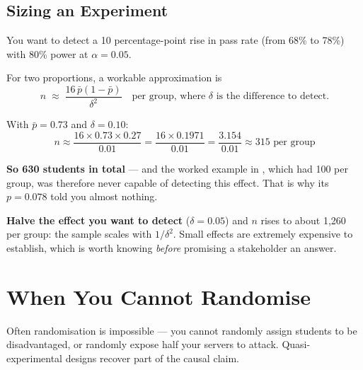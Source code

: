 \subsection{Sizing an Experiment}

\begin{worked}
You want to detect a 10 percentage-point rise in pass rate (from 68\% to 78\%) with
80\% power at $\alpha = 0.05$.

\smallskip
For two proportions, a workable approximation is
\[
n \;\approx\; \frac{16 \,\bar{p}(1-\bar{p})}{\delta^2}
\quad\text{per group, where } \delta \text{ is the difference to detect.}
\]

With $\bar{p} = 0.73$ and $\delta = 0.10$:
\[
n \approx \frac{16 \times 0.73 \times 0.27}{0.01}
        = \frac{16 \times 0.1971}{0.01}
        = \frac{3.154}{0.01} \approx 315 \text{ per group}
\]

\textbf{So 630 students in total} --- and the worked example in ,
which had 100 per group, was therefore never capable of detecting this effect. That
is why its $p = 0.078$ told you almost nothing.

\smallskip
\textbf{Halve the effect you want to detect} ($\delta = 0.05$) and $n$ rises to
about 1{,}260 per group: the sample scales with $1/\delta^2$. Small effects are
extremely expensive to establish, which is worth knowing \emph{before} promising a
stakeholder an answer.
\end{worked}

\section{When You Cannot Randomise}

Often randomisation is impossible --- you cannot randomly assign students to be
disadvantaged, or randomly expose half your servers to attack. Quasi-experimental
designs recover part of the causal claim.

